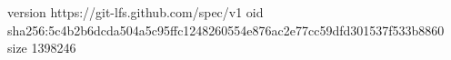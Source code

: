 version https://git-lfs.github.com/spec/v1
oid sha256:5c4b2b6dcda504a5c95ffc1248260554e876ac2e77cc59dfd301537f533b8860
size 1398246
